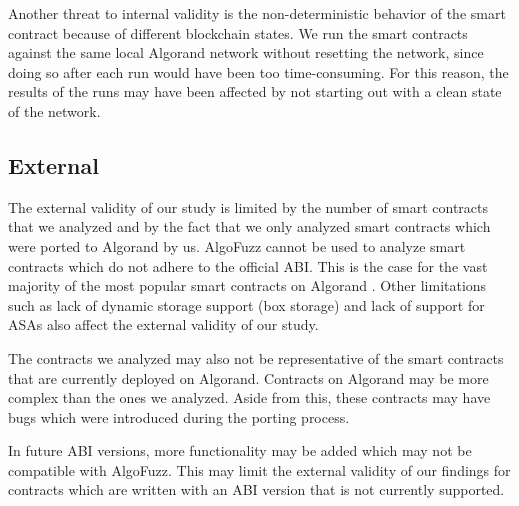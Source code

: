 Another threat to internal validity is the non-deterministic behavior of the smart contract because of different blockchain states.
We run the smart contracts against the same local Algorand network without resetting the network, since doing so after each run would have been too time-consuming.
For this reason, the results of the runs may have been affected by not starting out with a clean state of the network.

\subsection*{External}
The external validity of our study is limited by the number of smart contracts that we analyzed and by the fact that we only analyzed smart contracts which were ported to Algorand by us.
AlgoFuzz cannot be used to analyze smart contracts which do not adhere to the official \ac{ABI}.
This is the case for the vast majority of the most popular smart contracts on Algorand \cite{noauthor_algorand_nodate-6}.
Other limitations such as lack of dynamic storage support (box storage) and lack of support for \acp{ASA} also affect the external validity of our study.

The contracts we analyzed may also not be representative of the smart contracts that are currently deployed on Algorand.
Contracts on Algorand may be more complex than the ones we analyzed.
Aside from this, these contracts may have bugs which were introduced during the porting process.

In future \ac{ABI} versions, more functionality may be added which may not be compatible with AlgoFuzz.
This may limit the external validity of our findings for contracts which are written with an \ac{ABI} version that is not currently supported.